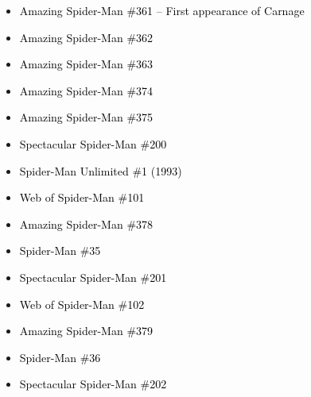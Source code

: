 \documentclass[12pt]{article}
\newcommand{\checkbox}{\raisebox{0.0ex}{\fbox{\rule{0ex}{1.5ex} \rule{1.5ex}{0ex}}}}
\begin{document}
\begin{center}
\begin{tcolorbox}[colback=white!95!gray, colframe=black, width=0.9\textwidth, arc=4mm, auto outer arc, boxrule=0.8pt]
\begin{itemize}[left=0pt,label={\checkbox}]
    \item \textcolor{black}{Amazing Spider-Man \#361 – First appearance of Carnage}
    \item \textcolor{black}{Amazing Spider-Man \#362}
    \item \textcolor{black}{Amazing Spider-Man \#363}
    \item \textcolor{black}{Amazing Spider-Man \#374}
    \item \textcolor{black}{Amazing Spider-Man \#375}
    \item \textcolor{black}{Spectacular Spider-Man \#200}
    \item \textcolor{black}{Spider-Man Unlimited \#1 (1993)}
    \item \textcolor{black}{Web of Spider-Man \#101}
    \item \textcolor{black}{Amazing Spider-Man \#378}
    \item \textcolor{black}{Spider-Man \#35}
    \item \textcolor{black}{Spectacular Spider-Man \#201}
    \item \textcolor{black}{Web of Spider-Man \#102}
    \item \textcolor{black}{Amazing Spider-Man \#379}
    \item \textcolor{black}{Spider-Man \#36}
    \item \textcolor{black}{Spectacular Spider-Man \#202}
\end{itemize}
\end{tcolorbox}
\end{center}
\end{document}
